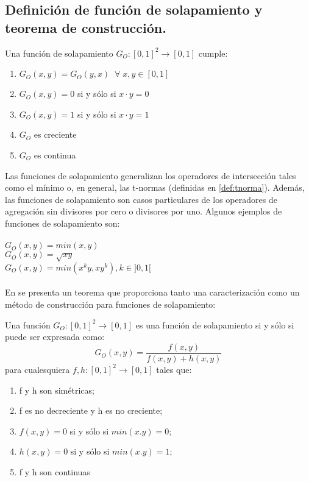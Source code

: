 \subsection{Definición de función de solapamiento y teorema de construcción.}
\begin{definition}
Una función de solapamiento $G_{O} : [0,1]^{2} \rightarrow [0,1]$ cumple:
\begin{enumerate}[label=(G\arabic*),ref=(G\arabic*)]
   \item $G_{O}(x,y) = G_{O}(y,x) \;\; \forall \; x,y \in [0,1]$ \label{G1}
   \item $G_{O}(x,y) = 0$ si y sólo si $x \cdot y = 0$ \label{G2}
   \item $G_{O}(x,y) = 1$ si y sólo si $x \cdot y = 1$ \label{G3}
   \item $G_{O}$ es creciente \label{G4}
   \item $G_{O}$ es continua \label{G5}
\end{enumerate}
\end{definition}
Las funciones de solapamiento generalizan los operadores de intersección tales como el mínimo o, en general, las t-normas (definidas en \ref{def:tnorma}). Además, las funciones de solapamiento son casos particulares de los operadores de agregación sin divisores por cero o divisores por uno. Algunos ejemplos de funciones de solapamiento son:\\
\\
$G_{O}(x,y) = min(x,y)$\\
$G_{O}(x,y) = \sqrt{xy}$\\
$G_{O}(x,y) = min(x^{k}y,xy^{k}), k \in ]0,1[$\\
\\
En \cite{bustince2009overlap} se presenta un teorema que proporciona tanto una caracterización como un método de construcción para funciones de solapamiento:
\begin{theorem}\label{th:overlap-function-construction}
Una función $G_{O} : [0,1]^{2} \rightarrow [0,1]$ es una función de solapamiento si y sólo si puede ser expresada como:
\begin{equation}
G_{O}(x,y) = \frac{f(x,y)}{f(x,y) + h(x,y)}
\end{equation}
para cualesquiera $f,h: [0,1]^{2} \rightarrow [0,1]$ tales que:
\begin{enumerate}[label=(\arabic*),ref=(\arabic*)]
   \item f y h son simétricas;
   \item f es no decreciente y h es no creciente;
   \item $f(x,y) = 0$ si y sólo si $min(x.y) = 0$;
   \item $h(x,y) = 0$ si y sólo si $min(x.y) = 1$;
   \item f y h son continuas
\end{enumerate}
\end{theorem}

